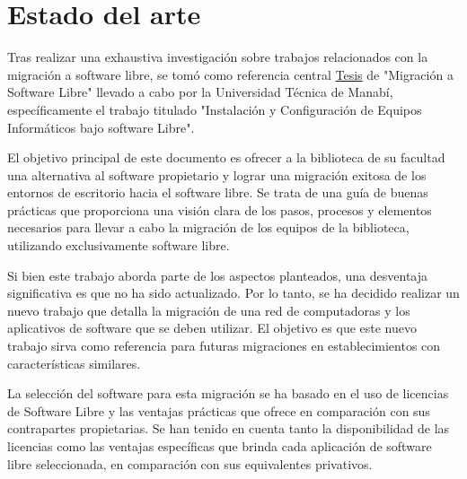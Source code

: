 \chapter{Estado del arte}\label{cap:estado}

	Tras realizar una exhaustiva investigación sobre trabajos relacionados con la migración a software libre, se tomó como referencia central \href{https://1library.co/document/4yr1o87q-universidad-tecnica-de-manabi-facultad-de-ciencias-informaticas.html}{\color{blue}Tesis} de "Migración a Software Libre" llevado a cabo por la Universidad Técnica de Manabí, específicamente el trabajo titulado "Instalación y Configuración de Equipos Informáticos bajo software Libre".\par 

El objetivo principal de este documento es ofrecer a la biblioteca de su facultad una alternativa al software propietario y lograr una migración exitosa de los entornos de escritorio hacia el software libre. Se trata de una guía de buenas prácticas que proporciona una visión clara de los pasos, procesos y elementos necesarios para llevar a cabo la migración de los equipos de la biblioteca, utilizando exclusivamente software libre.\par 

Si bien este trabajo aborda parte de los aspectos planteados, una desventaja significativa es que no ha sido actualizado. Por lo tanto, se ha decidido realizar un nuevo trabajo que detalla la migración de una red de computadoras y los aplicativos de software que se deben utilizar. El objetivo es que este nuevo trabajo sirva como referencia para futuras migraciones en establecimientos con características similares.\par 

La selección del software para esta migración se ha basado en el uso de licencias de Software Libre y las ventajas prácticas que ofrece en comparación con sus contrapartes propietarias. Se han tenido en cuenta tanto la disponibilidad de las licencias como las ventajas específicas que brinda cada aplicación de software libre seleccionada, en comparación con sus equivalentes privativos.\par 